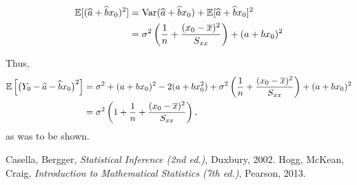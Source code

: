 \documentclass[12pt]{amsart}
\begin{document}
\begin{enumerate}
\begin{enumerate}
        \begin{align*}
            \operatorname{\mathbb{E}}[(\widehat a + \widehat b x_0)^2] &= \operatorname{Var} (\widehat a + \widehat b x_0) + \operatorname{\mathbb{E}}[\widehat a + \widehat b x_0]^2\\
            &= \sigma^2\left(\frac 1 n + \frac{(x_0 - \overline x)^2}{S_{xx}}\right) + (a+bx_0)^2
        \end{align*}

        Thus,
        \begin{align*}
            \operatorname{\mathbb{E}}\left[\big(Y_0 - \widehat a - \widehat b x_0\big)^2\right]
            &= \sigma^2 + (a+bx_0)^2 - 2(a+bx_0^2) 
            + \sigma^2\left(\frac 1 n + \frac{(x_0 - \overline x)^2}{S_{xx}}\right) + (a+bx_0)^2\\
            &=\sigma^2\left(1 + \frac 1 n + \frac{(x_0 - \overline x)^2}{S_{xx}}\right),
        \end{align*}
        as was to be shown.
    \end{enumerate}


    \end{enumerate}


    


    \begin{thebibliography}{99}
        Casella, Bergger, \emph{Statistical Inference (2nd ed.)}, Duxbury, 2002.
        Hogg, McKean, Craig, \emph{Introduction to Mathematical Statistics (7th ed.)}, Pearson, 2013.
    \end{thebibliography}
\end{document}
